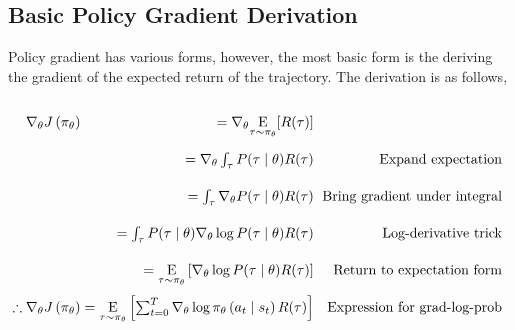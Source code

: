\newpage
\subsection{Basic Policy Gradient Derivation}\label{sec:pg:derivation}

Policy gradient has various forms, however, the most basic form is the deriving the gradient of the expected return of the trajectory. The derivation is as follows,

\begin{equation}
    \arraycolsep=1.4pt\def\arraystretch{2.2}
    \begin{array}{rrr}\nabla_{\theta} J\left(\pi_{\theta}\right) & =\nabla_{\theta} \underset{\tau \sim \pi_{\theta}}{\mathrm{E}}[R(\tau)] & \\ & =\nabla_{\theta} \int_{\tau} P(\tau \mid \theta) R(\tau) & \text { Expand expectation } \\ & =\int_{\tau} \nabla_{\theta} P(\tau \mid \theta) R(\tau) & \text { Bring gradient under integral } \\ & =\int_{\tau} P(\tau \mid \theta) \nabla_{\theta} \log P(\tau \mid \theta) R(\tau) & \text { Log-derivative trick } \\ & =\underset{\tau \sim \pi_{\theta}}{\mathrm{E}}\left[\nabla_{\theta} \log P(\tau \mid \theta) R(\tau)\right] & \text { Return to expectation form } \\ \therefore \nabla_{\theta} J\left(\pi_{\theta}\right) & =\underset{\tau \sim \pi_{\theta}}{\mathrm{E}}\left[\sum_{t=0}^{T} \nabla_{\theta} \log \pi_{\theta}\left(a_{t} \mid s_{t}\right) R(\tau)\right] & \text { Expression for grad-log-prob }\end{array}
\end{equation}

